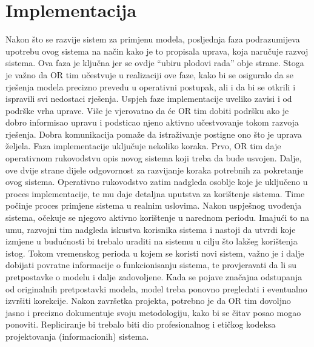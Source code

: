 \documentclass[a4paper, utf8, 11pt, colorlinks]{book}
\theoremstyle{definition}
\begin{document}
\section{Implementacija}
Nakon što se razvije sistem za primjenu modela, posljednja faza  podrazumijeva upotrebu ovog sistema  na način kako je to propisala uprava, koja naručuje razvoj sistema. Ova faza je ključna jer se ovdje ``ubiru plodovi rada'' obje strane. Stoga je važno da OR tim  učestvuje u  realizaciji ove faze, kako bi se osiguralo da se rješenja modela precizno prevedu u operativni postupak, ali i da bi se otkrili i ispravili svi nedostaci rješenja. Uspjeh faze implementacije uveliko zavisi i od podrške vrha uprave. Više je vjerovatno da će OR tim dobiti podršku ako je dobro informisao upravu i podsticao  njeno aktivno učestvovanje tokom razvoja rješenja. Dobra komunikacija pomaže da istraživanje postigne ono što je uprava željela.  Faza implementacije uključuje nekoliko koraka. Prvo, OR tim daje operativnom rukovodstvu opis novog sistema koji treba da bude usvojen. Dalje, ove dvije strane dijele odgovornost za razvijanje koraka potrebnih za pokretanje ovog sistema. Operativno rukovodstvo zatim nadgleda  osoblje koje je uključeno u proces implementacije, te mu daje detaljna uputstva za korištenje sistema. Time počinje proces primjene sistema u realnim uslovima. Nakon uspješnog uvođenja sistema, očekuje se njegovo aktivno korištenje u narednom periodu. Imajući to na umu, razvojni tim nadgleda iskustva korisnika sistema i nastoji da utvrdi koje izmjene u budućnosti bi trebalo uraditi na sistemu  u cilju što lakšeg korištenja istog.  Tokom vremenskog perioda u kojem se koristi novi sistem, važno je i dalje dobijati povratne informacije o funkcionisanju sistema, te provjeravati da li su pretpostavke o modelu i dalje zadovoljene. Kada se pojave značajna odstupanja od originalnih pretpostavki modela, model treba ponovno pregledati i eventualno izvršiti korekcije. Nakon završetka projekta, potrebno je da OR tim  dovoljno jasno i precizno dokumentuje svoju metodologiju, kako bi se čitav posao mogao ponoviti. Repliciranje bi trebalo
biti dio profesionalnog i etičkog kodeksa projektovanja (informacionih) sistema. %
\end{document}
